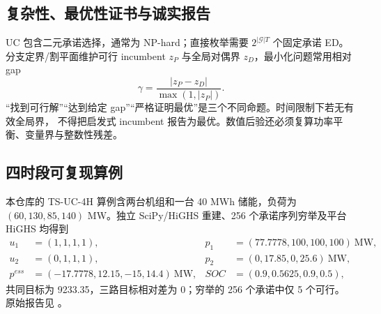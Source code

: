 \subsection{复杂性、最优性证书与诚实报告}
UC 包含二元承诺选择，通常为 NP-hard；直接枚举需要 $2^{|\mathcal G|T}$ 个固定承诺 ED。
分支定界/割平面维护可行 incumbent $z_P$ 与全局对偶界 $z_D$，最小化问题常用相对 gap
\begin{equation}
\gamma=\frac{|z_P-z_D|}{\max(1,|z_P|)}.\label{eq:ts-gap}
\end{equation}
“找到可行解”“达到给定 gap”“严格证明最优”是三个不同命题。时间限制下若无有效全局界，
不得把启发式 incumbent 报告为最优。数值后验还必须复算功率平衡、变量界与整数性残差。

\subsection{四时段可复现算例}
本仓库的 TS-UC-4H 算例含两台机组和一台 40 MWh 储能，负荷为
$(60,130,85,140)$ MW。独立 SciPy/HiGHS 重建、256 个承诺序列穷举及平台 HiGHS 均得到
\begin{align*}
u_1&=(1,1,1,1),&p_1&=(77.7778,100,100,100)\ \mathrm{MW},\\
u_2&=(0,1,1,1),&p_2&=(0,17.85,0,25.6)\ \mathrm{MW},\\
p^{ess}&=(-17.7778,12.15,-15,14.4)\ \mathrm{MW},&
SOC&=(0.9,0.5625,0.9,0.5),
\end{align*}
共同目标为 9233.35，三路目标相对差为 0；穷举的 256 个承诺中仅 5 个可行。
原始报告见 。

